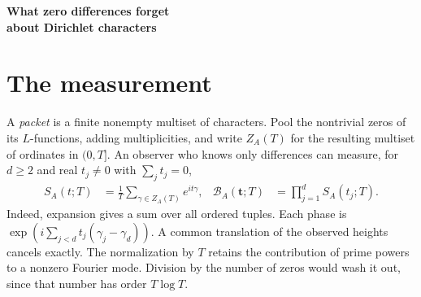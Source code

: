 \documentclass[11pt,letterpaper]{article}
\newcommand{\cB}{\mathcal B}
\begin{document}
\thispagestyle{plain}
\vspace{9pt}
\begin{center}
{\LARGE\bfseries What zero differences forget\\[3pt] about Dirichlet characters}\par
\end{center}
\begin{abstract}
We classify the balanced Fourier measurements of the pooled positive zero ordinates of a product of primitive Dirichlet $L$-functions. They determine, at each unramified prime, the multiset of twist values up to a rotation that can depend on the prime. For quadratic twists this is exactly equality of the multisets of pairwise character quotients. At conductor $32045$, one measurement class contains exactly 28 common-twist classes of six-factor products in an explicit family. Two of them differ by at least $(\sqrt2\log 2/\pi)T-O(\log T)$ zero occurrences up to height $T$. Despite this discrepancy, their balanced measurements agree asymptotically even when the frequencies grow to $(2-\delta)\log T$. For twists of odd prime exponent, a single complex cubic measurement per residue class recovers its local multiset up to rotation. When the packet size is coprime to the exponent, these local rotations come from one global twist.
\end{abstract}

\section{The measurement}
A \emph{packet} is a finite nonempty multiset of characters. Pool the nontrivial zeros of its $L$-functions, adding multiplicities, and write $Z_A(T)$ for the resulting multiset of ordinates in $(0,T]$. An observer who knows only differences can measure, for $d\ge2$ and real $t_j\ne0$ with $\sum_j t_j=0$,
\begin{align}
 S_A(t;T)&=\frac1T\sum_{\gamma\in Z_A(T)}e^{it\gamma},
 &\cB_A(\mathbf t;T)&=\prod_{j=1}^d S_A(t_j;T). \label{eq:observable}
\end{align}
Indeed, expansion gives a sum over all ordered tuples. Each phase is
$\exp(i\sum_{j<d}t_j(\gamma_j-\gamma_d))$. A common translation of the observed heights cancels exactly. The normalization by $T$ retains the contribution of prime powers to a nonzero Fourier mode. Division by the number of zeros would wash it out, since that number has order $T\log T$.
\end{document}
